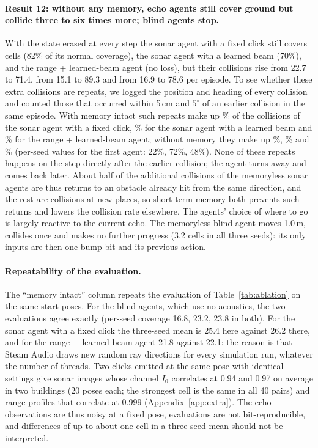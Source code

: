 \paragraph{Result 12: without any memory, echo agents still cover ground but collide three to six times more; blind agents stop.} With the state erased at every step the sonar agent with a fixed click still covers  cells (82\% of its normal coverage), the sonar agent with a learned beam  (70\%), and the range + learned-beam agent  (no loss), but their collisions rise from 22.7 to 71.4, from 15.1 to 89.3 and from 16.9 to 78.6 per episode. To see whether these extra collisions are repeats, we logged the position and heading of every collision and counted those that occurred within 5\,cm and $5^\circ$ of an earlier collision in the same episode. With memory intact such repeats make up \% of the collisions of the sonar agent with a fixed click, \% for the sonar agent with a learned beam and \% for the range + learned-beam agent; without memory they make up \%, \% and \% (per-seed values for the first agent: 22\%, 72\%, 48\%). None of these repeats happens on the step directly after the earlier collision; the agent turns away and comes back later. About half of the additional collisions of the memoryless sonar agents are thus returns to an obstacle already hit from the same direction, and the rest are collisions at new places, so short-term memory both prevents such returns and lowers the collision rate elsewhere. The agents' choice of where to go is largely reactive to the current echo. The memoryless blind agent moves 1.0\,m, collides once and makes no further progress (3.2 cells in all three seeds): its only inputs are then one bump bit and its previous action.

\paragraph{Repeatability of the evaluation.} The ``memory intact'' column repeats the evaluation of Table~\ref{tab:ablation} on the same start poses. For the blind agents, which use no acoustics, the two evaluations agree exactly (per-seed coverage 16.8, 23.2, 23.8 in both). For the sonar agent with a fixed click the three-seed mean is 25.4 here against 26.2 there, and for the range + learned-beam agent 21.8 against 22.1: the reason is that Steam Audio draws new random ray directions for every simulation run, whatever the number of threads. Two clicks emitted at the same pose with identical settings give sonar images whose channel $I_0$ correlates at 0.94 and 0.97 on average in two buildings (20 poses each; the strongest cell is the same in all 40 pairs) and range profiles that correlate at 0.999 (Appendix~\ref{app:extra}). The echo observations are thus noisy at a fixed pose, evaluations are not bit-reproducible, and differences of up to about one cell in a three-seed mean should not be interpreted.

